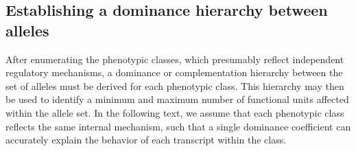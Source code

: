 \documentclass[10pt, twocolumn]{article}
\newcommand{\gene}[1]{\mbox{\emph{#1}}}
\begin{document}
\subsection*{Establishing a dominance hierarchy between alleles}
After enumerating the phenotypic classes, which presumably reflect independent
regulatory mechanisms, a dominance or complementation hierarchy between the set
of alleles must be derived for each phenotypic class. This hierarchy may then be
used to identify a minimum and maximum number of functional units affected
within the allele set.
In the following text, we assume that each phenotypic
class reflects the same internal mechanism, such that a single dominance
coefficient can accurately explain the behavior of each transcript within the
class.
\end{document}
